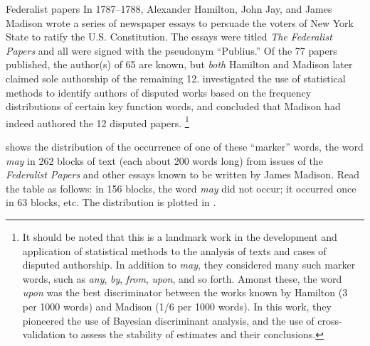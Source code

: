 \documentclass[11pt]{book}
\renewenvironment{knitrout}{\small\renewcommand{\baselinestretch}{.85}}{} %
\begin{document}
\begin{Example}[madison1]{Federalist papers}
In 1787--1788, Alexander Hamilton, John Jay, and James Madison
wrote a series of newspaper essays to persuade the voters of
New York State to ratify the U.S. Constitution.
The essays were titled \emph{The Federalist Papers}
and all were signed with the pseudonym ``Publius.''  Of the 77 papers published,
the author(s) of 65 are known, but \emph{both}
Hamilton and Madison later claimed sole authorship of the remaining 12.
\citet{MostellerWallace:63,MostellerWallace:84}
investigated the use of statistical methods to identify authors of
disputed works based on the frequency distributions of certain key
function words, and concluded that Madison had indeed authored the
12 disputed papers.%
\footnote{
It should be noted that this is a landmark work in the development and
application of statistical methods to the analysis of texts and
cases of disputed authorship. In addition to
\emph{may}, they considered many such marker words,
such as \emph{any}, \emph{by}, \emph{from}, \emph{upon}, and so forth.
Amonst these, the word \emph{upon} was the best discriminator between
the works known by Hamilton (3 per 1000 words) and Madison (1/6 per 1000 words).
In this work, they pioneered the use of Bayesian discriminant analysis,
and the use of cross-validation to assess the stability of estimates
and their conclusions.
}

 shows the distribution of the occurrence of one of
these ``marker'' words, 
the
word \emph{may} in 262 blocks of text (each about 200 words long)
from issues of the \emph{Federalist Papers} and other essays known
to be written by James Madison.  Read the table as follows:
in 156 blocks, the word \emph{may}
did not occur; it occurred once in 63 blocks, etc.  The distribution
is plotted in .


\begin{knitrout}
\color{fgcolor}\begin{kframe}
\begin{alltt}
 \hlstd{=}\hlstd{)}
        \hlstd{=}\hlstd{,} \hlstd{=}\hlstd{,}
        \hlstd{=}\hlstd{,} \hlstd{=}\hlstd{)}
\end{alltt}
\end{kframe}\begin{figure}[!htbp]



\end{figure}
\end{knitrout}
\end{Example}
\end{document}

